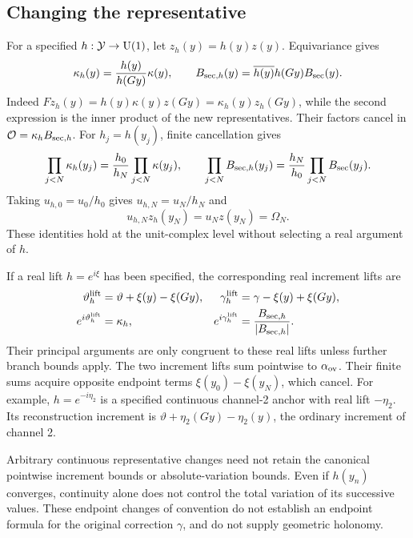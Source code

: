 \subsection{Changing the representative}
For a specified \(h:\mathcal Y\to\mathrm U(1)\), let \(z_h(y)=h(y)z(y)\). Equivariance gives
\begin{equation}
\kappa_h(y)=\frac{h(y)}{h(Gy)}\kappa(y),\qquad
B_{{\rm sec},h}(y)=\overline{h(y)}h(Gy)B_{\rm sec}(y).
\label{eq:sectionchange}
\end{equation}
Indeed \(Fz_h(y)=h(y)\kappa(y)z(Gy)=\kappa_h(y)z_h(Gy)\), while the second expression is the inner product of the new representatives. Their factors cancel in \(\mathcal O=\kappa_h B_{{\rm sec},h}\). For \(h_j=h(y_j)\), finite cancellation gives
\begin{equation}
\prod_{j<N}\kappa_h(y_j)=\frac{h_0}{h_N}\prod_{j<N}\kappa(y_j),\qquad
\prod_{j<N}B_{{\rm sec},h}(y_j)=\frac{h_N}{h_0}\prod_{j<N}B_{\rm sec}(y_j).
\label{eq:sectionproducts}
\end{equation}
Taking \(u_{h,0}=u_0/h_0\) gives \(u_{h,N}=u_N/h_N\) and
\begin{equation}
u_{h,N}z_h(y_N)=u_Nz(y_N)=\Omega_N.
\label{eq:statecancellation}
\end{equation}
These identities hold at the unit-complex level without selecting a real argument of \(h\).

If a real lift \(h=e^{i\xi}\) has been specified, the corresponding real increment lifts are
\begin{align}
\vartheta_h^{\rm lift}&=\vartheta+\xi(y)-\xi(Gy),&
\gamma_h^{\rm lift}&=\gamma-\xi(y)+\xi(Gy),\label{eq:gaugelifts}\\
e^{i\vartheta_h^{\rm lift}}&=\kappa_h,&
e^{i\gamma_h^{\rm lift}}&=\frac{B_{{\rm sec},h}}{|B_{{\rm sec},h}|}.\notag
\end{align}
Their principal arguments are only congruent to these real lifts unless further branch bounds apply. The two increment lifts sum pointwise to \(\alpha_{\rm ov}\). Their finite sums acquire opposite endpoint terms \(\xi(y_0)-\xi(y_N)\), which cancel. For example, \(h=e^{-i\eta_2}\) is a specified continuous channel-2 anchor with real lift \(-\eta_2\). Its reconstruction increment is \(\vartheta+\eta_2(Gy)-\eta_2(y)\), the ordinary increment of channel 2.

Arbitrary continuous representative changes need not retain the canonical pointwise increment bounds or absolute-variation bounds. Even if \(h(y_n)\) converges, continuity alone does not control the total variation of its successive values. These endpoint changes of convention do not establish an endpoint formula for the original correction \(\gamma\), and do not supply geometric holonomy.
